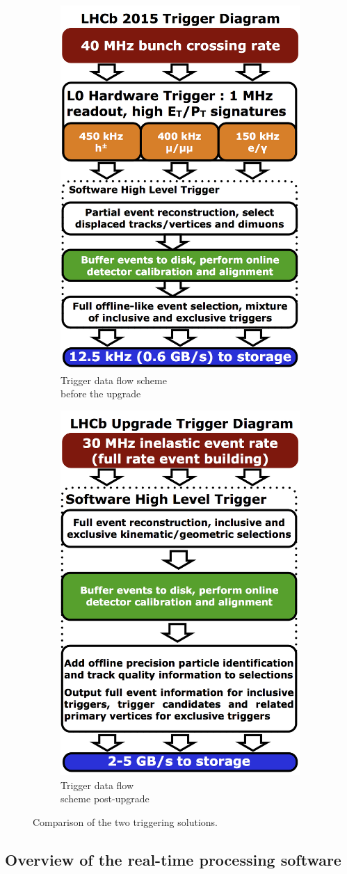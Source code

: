 \documentclass[12pt]{article}
\begin{document}
\begin{figure}[H]
	\centering
	\begin{subfigure}{.5\textwidth}
		\centering
		\includegraphics[width=.4\linewidth]{LHCb_Trigger_RunII_May2015}
		\caption{Trigger data flow scheme\\ before the upgrade}
		\label{fig_trigger_compare_sub1}
	\end{subfigure}%
	\begin{subfigure}{.5\textwidth}
		\centering
		\includegraphics[width=.4\linewidth]{LHCb_Trigger_RunIII_May2015}
		\caption{Trigger data flow\\ scheme post-upgrade}
		\label{fig_trigger_compare_sub2}
	\end{subfigure}
	\caption{Comparison of the two triggering solutions. \cite{lhcb_twiki}}
	\label{fig_trigger_compare}
\end{figure}


\subsection{Overview of the real-time processing software}\label{sec_reco_sw_overview}
	
\end{document}
